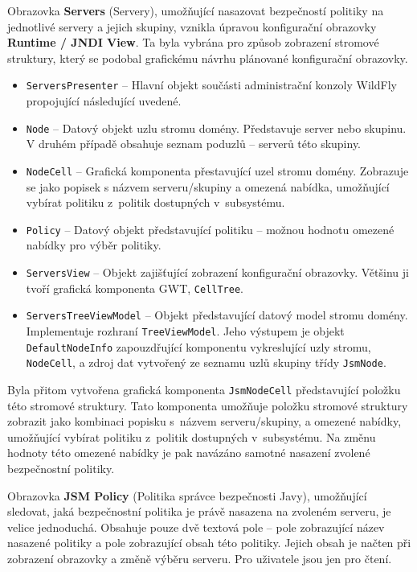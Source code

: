 Obrazovka {\bf Servers} (Servery), umožňující nasazovat bezpečností politiky na jednotlivé servery a jejich skupiny, vznikla úpravou konfigurační obrazovky {\bf Runtime / JNDI View}. Ta byla vybrána pro způsob zobrazení stromové struktury, který se podobal grafickému návrhu plánované konfigurační obrazovky.

\begin{itemize}
  \item {\tt ServersPresenter} -- Hlavní objekt součásti administrační konzoly WildFly propojující následující uvedené.
  \item {\tt Node} -- Datový objekt uzlu stromu domény. Představuje server nebo skupinu. V druhém případě obsahuje seznam poduzlů -- serverů této skupiny.
  \item {\tt NodeCell} -- Grafická komponenta přestavující uzel stromu domény. Zobrazuje se jako popisek s názvem serveru/skupiny a omezená nabídka, umožňující vybírat politiku z~politik dostupných v~subsystému.
  \item {\tt Policy} -- Datový objekt představující politiku -- možnou hodnotu omezené nabídky pro výběr politiky.
  \item {\tt ServersView} -- Objekt zajišťující zobrazení konfigurační obrazovky. Většinu ji tvoří grafická komponenta GWT, {\tt CellTree}.
  \item {\tt ServersTreeViewModel} -- Objekt představující datový model stromu domény. Implementuje rozhraní {\tt TreeViewModel}. Jeho výstupem je objekt {\tt DefaultNodeInfo} zapouzdřující komponentu vykreslující uzly stromu, {\tt NodeCell}, a zdroj dat vytvořený ze seznamu uzlů skupiny třídy {\tt JsmNode}.
\end{itemize}

Byla přitom vytvořena grafická komponenta {\tt JsmNodeCell} představující položku této stromové struktury.
Tato komponenta umožňuje položku stromové struktury zobrazit jako kombinaci popisku s~názvem serveru/skupiny, a omezené nabídky, umožňující vybírat politiku z~politik dostupných v~subsystému.
Na změnu hodnoty této omezené nabídky je pak navázáno samotné nasazení zvolené bezpečnostní politiky.


Obrazovka {\bf JSM Policy} (Politika správce bezpečnosti Javy), umožňující sledovat, jaká bezpečnostní politika je právě nasazena na zvoleném serveru, je velice jednoduchá. Obsahuje pouze dvě textová pole -- pole zobrazující název nasazené politiky a pole zobrazující obsah této politiky. Jejich obsah je načten při zobrazení obrazovky a změně výběru serveru. Pro uživatele jsou jen pro čtení.

